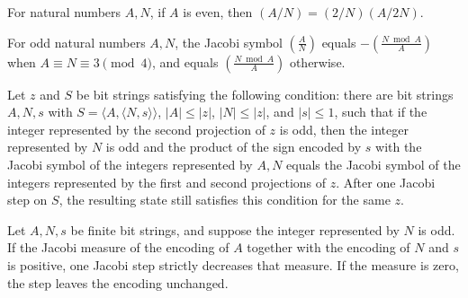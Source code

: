\begin{theorem}
\label{Complexity.BinArith.jacobiSym_even}
\leanok
{}
For natural numbers $A,N$, if $A$ is even, then $(A/N)=(2/N)(A/2N)$.
\end{theorem}

\begin{theorem}
\label{Complexity.BinArith.jacobiSym_odd}
\leanok
{}
For odd natural numbers $A,N$, the Jacobi symbol $\left(\frac{A}{N}\right)$ equals $-\left(\frac{N\bmod A}{A}\right)$ when $A\equiv N\equiv3\pmod4$, and equals $\left(\frac{N\bmod A}{A}\right)$ otherwise.
\end{theorem}

\begin{theorem}
\label{Complexity.BinArith.jacInv_step}
\leanok
{}
Let $z$ and $S$ be bit strings satisfying the following condition: there are bit strings
$A,N,s$ with $S=\langle A,\langle N,s\rangle\rangle$, $|A|\le |z|$, $|N|\le |z|$, and
$|s|\le 1$, such that if the integer represented by the second projection of $z$ is odd,
then the integer represented by $N$ is odd and the product of the sign encoded by $s$
with the Jacobi symbol of the integers represented by $A,N$ equals the Jacobi symbol of
the integers represented by the first and second projections of $z$. After one Jacobi
step on $S$, the resulting state still satisfies this condition for the same $z$.
\end{theorem}

\begin{theorem}
\label{Complexity.BinArith.jacMeasure_step}
\leanok
{}
Let $A,N,s$ be finite bit strings, and suppose the integer represented by $N$ is odd. If
the Jacobi measure of the encoding of $A$ together with the encoding of $N$ and $s$ is
positive, one Jacobi step strictly decreases that measure. If the measure is zero, the
step leaves the encoding unchanged.
\end{theorem}

